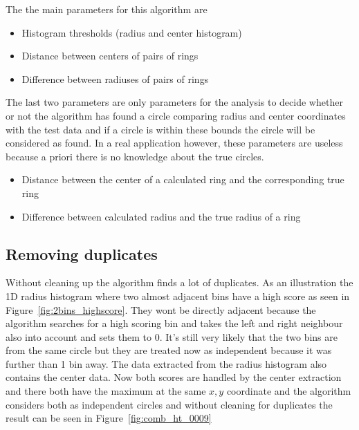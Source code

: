 \documentclass[11pt,twoside]{scrreprt}
\begin{document}
The the main parameters for this algorithm are
\begin{itemize}
  \item Histogram thresholds (radius and center histogram)
  \item Distance between centers of pairs of rings
  \item Difference between radiuses of pairs of rings
\end{itemize}

The last two parameters are only parameters for the analysis to decide whether or not the algorithm has found a circle comparing radius
and center coordinates with the test data and if a circle is within these bounds the circle will be considered as found. In a real application
however, these parameters are useless because a priori there is no knowledge about the true circles.

\begin{itemize}
  \item Distance between the center of a calculated ring and the corresponding true ring
  \item Difference between calculated radius and the true radius of a ring
\end{itemize}

\subsection{Removing duplicates} %
\label{ssub:getting_rid_of_duplicates}


Without cleaning up the algorithm finds a lot of duplicates. As an illustration the 1D radius histogram where two almost adjacent bins have a high score as 
seen in Figure~\ref{fig:2bins_highscore}. They wont be directly adjacent because the algorithm searches for a high scoring bin and takes
the left and right neighbour also into account and sets them to 0.
It's still very likely that the two bins are from the same circle but they are treated now as independent because it was further than 1 bin 
away. The data extracted from the radius histogram also contains the center data. Now both scores are handled by the center extraction and
there both have the maximum at the same $x,y$ coordinate and the algorithm considers both as independent circles and without cleaning for duplicates
the result can be seen in Figure~\ref{fig:comb_ht_0009}
\end{document}
